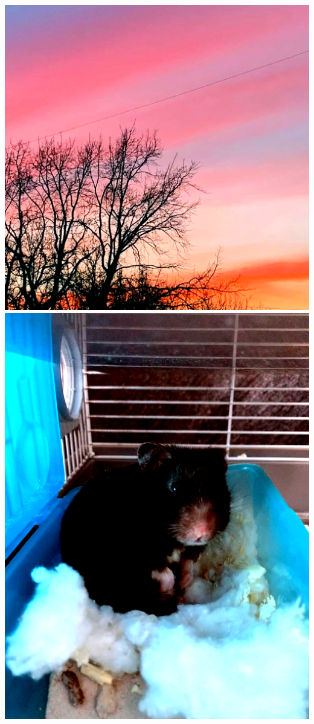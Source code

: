 \documentclass{article}
\begin{document}
\includegraphics[totalheight = 4cm]{212.png} \hspace{1.5cm}
\includegraphics[totalheight = 4cm]{312.png} \\
\end{document}
